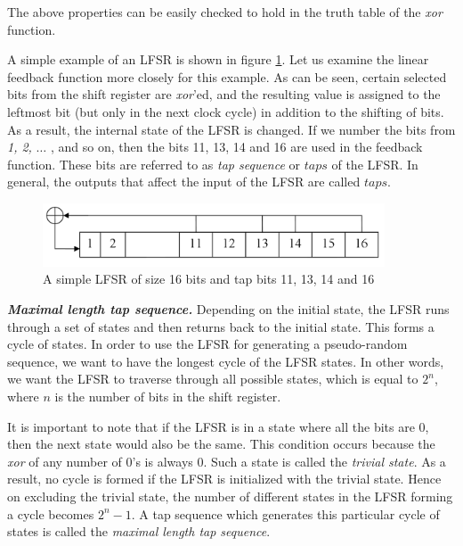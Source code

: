 The above properties can be easily checked to hold in the truth table of the \emph{xor} function.

A simple example of an LFSR is shown in figure \ref{fig:lfsr-example1}. Let us examine the linear feedback function more closely for this example. As can be seen, certain selected bits from the shift register are \emph{xor}'ed, and the resulting value is assigned to the leftmost bit (but only in the next clock cycle) in addition to the shifting of bits. As a result, the internal state of the LFSR is changed. If we number the bits from \emph{1, 2,} $\ldots$ , and so on, then the bits 11, 13, 14 and 16 are used in the feedback function. These bits are referred to as \emph{tap sequence} or $taps$ of the LFSR. In general, the outputs that affect the input of the LFSR are called $taps$.\\


\begin{figure}[ht!]
	\centering
		\includegraphics[width=4in]{./figures/lfsr-example.PNG}
	\caption{A simple LFSR of size 16 bits and tap bits 11, 13, 14 and 16}	
	\label{fig:lfsr-example1}
\end{figure}

\noindent \textit{\textbf{Maximal length tap sequence.}} Depending on the initial state, the LFSR runs through a set of states and then returns back to the initial state. This forms a cycle of states. In order to use the LFSR for generating a pseudo-random sequence, we want to have the longest cycle of the LFSR states. In other words, we want the LFSR to traverse through all possible states, which is equal to $2^n$, where $n$ is the number of bits in the shift register. 

It is important to note that if the LFSR is in a state where all the bits are 0, then the next state would also be the same. This condition occurs because the \textit{xor} of any number of 0's is always 0. Such a state is called the \textit{trivial state}. As a result, no cycle is formed if the LFSR is initialized with the trivial state. Hence on excluding the trivial state, the number of different states in the LFSR forming a cycle becomes $2^n-1$. A tap sequence which generates this particular cycle of states is called the \textit{maximal length tap sequence}. 

